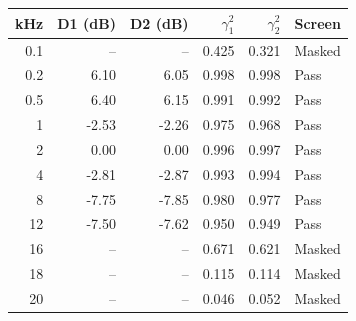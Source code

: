 \begin{tabular}{@{}rrrrrl@{}}
\toprule
kHz & D1 (dB) & D2 (dB) & $\gamma^2_1$ & $\gamma^2_2$ & Screen \\
\midrule
0.1 & -- & -- & 0.425 & 0.321 & Masked \\
0.2 & 6.10 & 6.05 & 0.998 & 0.998 & Pass \\
0.5 & 6.40 & 6.15 & 0.991 & 0.992 & Pass \\
1 & -2.53 & -2.26 & 0.975 & 0.968 & Pass \\
2 & 0.00 & 0.00 & 0.996 & 0.997 & Pass \\
4 & -2.81 & -2.87 & 0.993 & 0.994 & Pass \\
8 & -7.75 & -7.85 & 0.980 & 0.977 & Pass \\
12 & -7.50 & -7.62 & 0.950 & 0.949 & Pass \\
16 & -- & -- & 0.671 & 0.621 & Masked \\
18 & -- & -- & 0.115 & 0.114 & Masked \\
20 & -- & -- & 0.046 & 0.052 & Masked \\
\bottomrule
\end{tabular}
